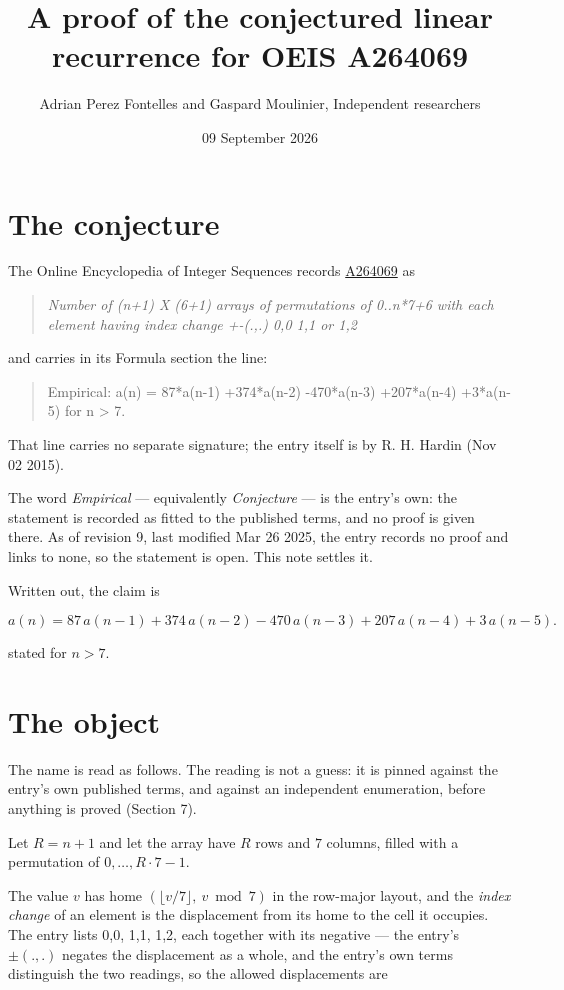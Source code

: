 \documentclass[11pt]{article}
\title{A proof of the conjectured linear recurrence for OEIS A264069}
\author{Adrian Perez Fontelles and Gaspard Moulinier, Independent researchers}
\date{09 September 2026}
\theoremstyle{definition}
\begin{document}
\maketitle
\section{The conjecture}

The Online Encyclopedia of Integer Sequences records \href{https://oeis.org/A264069}{A264069} as

\begin{quote}\itshape Number of (n+1) X (6+1) arrays of permutations of 0..n*7+6 with each element having index change +-(.,.) 0,0 1,1 or 1,2\end{quote}

and carries in its Formula section the line:

\begin{quote}\ttfamily Empirical: a(n) = 87*a(n-1) +374*a(n-2) -470*a(n-3) +207*a(n-4) +3*a(n-5) for n > 7.\end{quote}

That line carries no separate signature; the entry itself is by R. H. Hardin (Nov 02 2015).

The word {\itshape Empirical} --- equivalently {\itshape Conjecture} --- is the entry's own: the statement is recorded as fitted to the published terms, and no proof is given there. As of revision 9, last modified Mar 26 2025, the entry records no proof and links to none, so the statement is open. This note settles it.

Written out, the claim is

\[a(n) = 87\,a(n-1) + 374\,a(n-2) - 470\,a(n-3) + 207\,a(n-4) + 3\,a(n-5).\]

stated for $n > 7$.

\section{The object}

The name is read as follows. The reading is not a guess: it is pinned against the entry's own published terms, and against an independent enumeration, before anything is proved (Section 7).

Let $R = n + 1$ and let the array have $R$ rows and $7$ columns, filled with a permutation of $0,\dots,R\cdot7-1$.

The value $v$ has home $(\lfloor v/7\rfloor,\ v \bmod 7)$ in the row-major layout, and the {\itshape index change} of an element is the displacement from its home to the cell it occupies. The entry lists 0,0, 1,1, 1,2, each together with its negative --- the entry's $\pm(.,.)$ negates the displacement as a whole, and the entry's own terms distinguish the two readings, so the allowed displacements are
\end{document}
